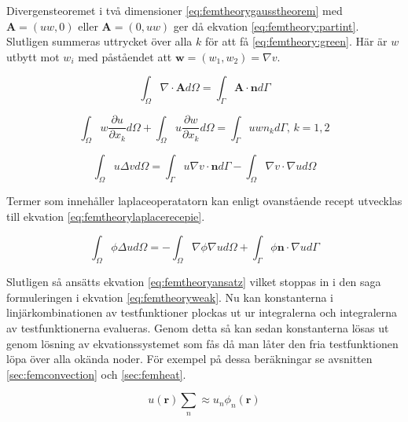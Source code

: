 Divergensteoremet i två dimensioner \eqref{eq:femtheorygausstheorem}
med $\mathbf{A} = (uw, 0)$ eller $\mathbf{A} = (0, uw)$ ger då ekvation
\eqref{eq:femtheory:partint}. Slutligen summeras uttrycket över alla
$k$ för att få \eqref{eq:femtheory:green}. Här är $w$ utbytt mot $w_i$ med
påståendet att $\mathbf{w} = (w_1, w_2) = \nabla v$. \cite{johnson2009}

\begin{equation}
\label{eq:femtheorygausstheorem}
\int_\Omega \nabla\cdot \mathbf{A} d\Omega = \int_\Gamma \mathbf{A}\cdot\mathbf{n} d\Gamma
\end{equation}

\begin{equation}
\label{eq:femtheory:partint}
\int_\Omega w\frac{\partial u}{\partial x_k} d\Omega +
\int_\Omega u\frac{\partial w}{\partial x_k} d\Omega =
\int_\Gamma uwn_k d\Gamma\mbox{,   }k=1,2
\end{equation}

\begin{equation}
\label{eq:femtheory:green}
\int_\Omega u\Delta v d\Omega =
\int_\Gamma u\nabla v\cdot\mathbf{n}d\Gamma-\int_\Omega \nabla v\cdot\nabla u d\Omega
\end{equation}

\noindent
Termer som innehåller laplaceoperatatorn kan enligt ovanstående recept utvecklas
till ekvation \eqref{eq:femtheorylaplacerecepie}.

\begin{equation}
\label{eq:femtheorylaplacerecepie}
\int_\Omega \phi\Delta u d\Omega = -\int_\Omega \nabla\phi\nabla u d\Omega +
\int_\Gamma \phi \mathbf{n}\cdot\nabla u d\Gamma
\end{equation} 

\noindent
Slutligen så ansätts ekvation \eqref{eq:femtheoryansatz} vilket stoppas
in i den saga formuleringen i ekvation \eqref{eq:femtheoryweak}. Nu kan
konstanterna i linjärkombinationen av testfunktioner plockas ut ur integralerna
och integralerna av testfunktionerna evalueras. Genom detta så kan
sedan konstanterna lösas ut genom lösning av ekvationssystemet som
fås då man låter den fria testfunktionen löpa över alla okända noder.
För exempel på dessa beräkningar se avsnitten \ref{sec:femconvection} och
\ref{sec:femheat}.

\begin{equation}
\label{eq:femtheoryansatz}
u(\mathbf{r}) \sum_n \approx u_n \phi_n(\mathbf{r})
\end{equation}



